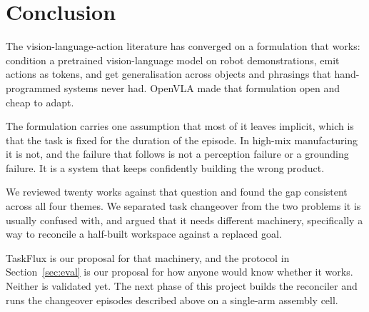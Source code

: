 \documentclass[conference]{IEEEtran}
\begin{document}
\section{Conclusion}

The vision-language-action literature has converged on a formulation that
works: condition a pretrained vision-language model on robot
demonstrations, emit actions as tokens, and get generalisation across
objects and phrasings that hand-programmed systems never had. OpenVLA
made that formulation open and cheap to adapt.

The formulation carries one assumption that most of it leaves implicit, which
is that the task is fixed for the duration of the episode. In high-mix
manufacturing it is not, and the failure that follows is not a perception
failure or a grounding failure. It is a system that keeps confidently
building the wrong product.

We reviewed twenty works against that question and found the gap
consistent across all four themes. We separated task changeover from the
two problems it is usually confused with, and argued that it needs
different machinery, specifically a way to reconcile a half-built
workspace against a replaced goal.

TaskFlux is our proposal for that machinery, and the protocol in
Section~\ref{sec:eval} is our proposal for how anyone would know whether
it works. Neither is validated yet. The next phase of this project builds
the reconciler and runs the changeover episodes described above on a
single-arm assembly cell.
\end{document}
